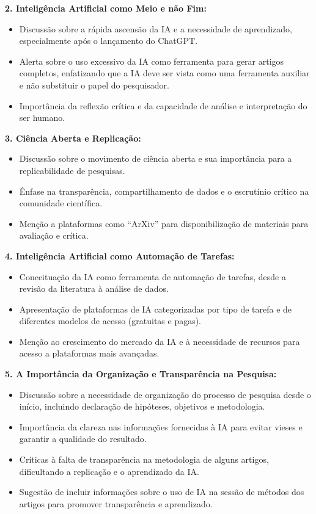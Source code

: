 \documentclass[
  a4paper,
]{article}
\providecommand{\tightlist}{%
  \setlength{\itemsep}{0pt}\setlength{\parskip}{0pt}}\usepackage{longtable,booktabs,array}
\begin{document}
\begin{tcolorbox}
\textbf{2. Inteligência Artificial como Meio e não Fim:}

\begin{itemize}
\tightlist
\item
  Discussão sobre a rápida ascensão da IA e a necessidade de
  aprendizado, especialmente após o lançamento do ChatGPT.
\item
  Alerta sobre o uso excessivo da IA como ferramenta para gerar artigos
  completos, enfatizando que a IA deve ser vista como uma ferramenta
  auxiliar e não substituir o papel do pesquisador.
\item
  Importância da reflexão crítica e da capacidade de análise e
  interpretação do ser humano.
\end{itemize}

\textbf{3. Ciência Aberta e Replicação:}

\begin{itemize}
\tightlist
\item
  Discussão sobre o movimento de ciência aberta e sua importância para a
  replicabilidade de pesquisas.
\item
  Ênfase na transparência, compartilhamento de dados e o escrutínio
  crítico na comunidade científica.
\item
  Menção a plataformas como ``ArXiv'' para disponibilização de materiais
  para avaliação e crítica.
\end{itemize}

\textbf{4. Inteligência Artificial como Automação de Tarefas:}

\begin{itemize}
\tightlist
\item
  Conceituação da IA como ferramenta de automação de tarefas, desde a
  revisão da literatura à análise de dados.
\item
  Apresentação de plataformas de IA categorizadas por tipo de tarefa e
  de diferentes modelos de acesso (gratuitas e pagas).
\item
  Menção ao crescimento do mercado da IA e à necessidade de recursos
  para acesso a plataformas mais avançadas.
\end{itemize}

\textbf{5. A Importância da Organização e Transparência na Pesquisa:}

\begin{itemize}
\tightlist
\item
  Discussão sobre a necessidade de organização do processo de pesquisa
  desde o início, incluindo declaração de hipóteses, objetivos e
  metodologia.
\item
  Importância da clareza nas informações fornecidas à IA para evitar
  vieses e garantir a qualidade do resultado.
\item
  Críticas à falta de transparência na metodologia de alguns artigos,
  dificultando a replicação e o aprendizado da IA.
\item
  Sugestão de incluir informações sobre o uso de IA na sessão de métodos
  dos artigos para promover transparência e aprendizado.
\end{itemize}


\end{tcolorbox}
\end{document}
